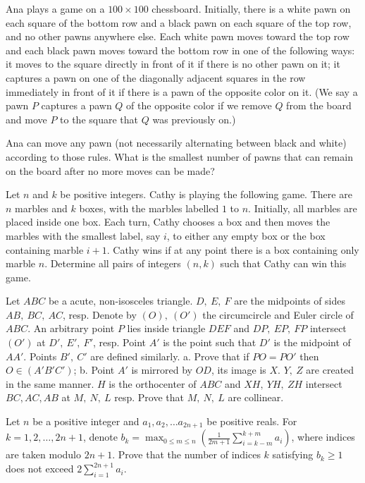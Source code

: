 \documentclass[11pt]{scrartcl}
\begin{document}
\begin{problem}[7205358409203299180]
	Ana plays a game on a $100\times 100$ chessboard. Initially, there is a white pawn on each square of the bottom row and a black pawn on each square of the top row, and no other pawns anywhere else.
Each white pawn moves toward the top row and each black pawn moves toward the bottom row in one of the following ways:
it moves to the square directly in front of it if there is no other pawn on it;
it captures a pawn on one of the diagonally adjacent squares in the row immediately in front of it if there is a pawn of the opposite color on it.
(We say a pawn $P$ captures a pawn $Q$ of the opposite color if we remove $Q$ from the board and move $P$ to the square that $Q$ was previously on.)

Ana can move any pawn (not necessarily alternating between black and white) according to those rules. What is the smallest number of pawns that can remain on the board after no more moves can be made?
\end{problem}
\begin{problem}[7208752288636072458]
Let $n$ and $k$ be positive integers. Cathy is playing the following game. There are $n$ marbles and $k$ boxes, with the marbles labelled $1$ to $n$. Initially, all marbles are placed inside one box. Each turn, Cathy chooses a box and then moves the marbles with the smallest label, say $i$, to either any empty box or the box containing marble $i+1$. Cathy wins if at any point there is a box containing only marble $n$.
Determine all pairs of integers $(n,k)$ such that Cathy can win this game.
\end{problem}
\begin{problem}[7220404010846068686]
	Let $ABC$ be a acute, non-isosceles triangle. $D,\ E,\ F$ are the midpoints of sides $AB,\ BC,\ AC$, resp. Denote by $(O),\ (O')$ the circumcircle and Euler circle of $ABC$. An arbitrary point $P$ lies inside triangle $DEF$ and $DP,\ EP,\ FP$ intersect $(O')$ at $D',\ E',\ F'$, resp. Point $A'$ is the point such that $D'$ is the midpoint of $AA'$. Points $B',\ C'$ are defined similarly.
a. Prove that if $PO=PO'$ then $O\in(A'B'C')$;
b. Point $A'$ is mirrored by $OD$, its image is $X$. $Y,\ Z$ are created in the same manner. $H$ is the orthocenter of $ABC$ and $XH,\ YH,\ ZH$ intersect $BC, AC, AB$ at $M,\ N,\ L$ resp. Prove that $M,\ N,\ L$ are collinear.
\end{problem}
\begin{problem}[7225949564896140758]
Let $n$ be a positive integer and $a_1,a_2,\ldots a_{2n+1}$ be positive reals. For $k=1,2,\ldots ,2n+1$, denote $b_k = \max_{0\le m\le n}\left(\frac{1}{2m+1} \sum_{i=k-m}^{k+m} a_i \right)$, where indices are taken modulo $2n+1$. Prove that the number of indices $k$ satisfying $b_k\ge 1$ does not exceed $2\sum_{i=1}^{2n+1} a_i$.
\end{problem}
\end{document}
